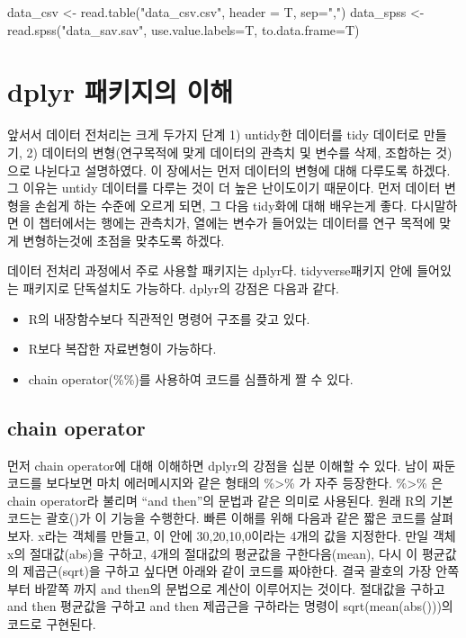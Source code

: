 \documentclass[
]{book}
\newenvironment{Shaded}{\begin{snugshade}}{\end{snugshade}}
\newcommand{\AttributeTok}[1]{\textcolor[rgb]{0.77,0.63,0.00}{#1}}
\newcommand{\FunctionTok}[1]{\textcolor[rgb]{0.00,0.00,0.00}{#1}}
\newcommand{\NormalTok}[1]{#1}
\newcommand{\OtherTok}[1]{\textcolor[rgb]{0.56,0.35,0.01}{#1}}
\newcommand{\StringTok}[1]{\textcolor[rgb]{0.31,0.60,0.02}{#1}}
\providecommand{\tightlist}{%
  \setlength{\itemsep}{0pt}\setlength{\parskip}{0pt}}
\theoremstyle{definition}
\theoremstyle{definition}
\theoremstyle{definition}
\theoremstyle{definition}
\theoremstyle{remark}
\begin{document}
\begin{Shaded}
\begin{Highlighting}[]
\NormalTok{data\_csv }\OtherTok{\textless{}{-}} \FunctionTok{read.table}\NormalTok{(}\StringTok{"data\_csv.csv"}\NormalTok{, }\AttributeTok{header =}\NormalTok{ T, }\AttributeTok{sep=}\StringTok{","}\NormalTok{) }
\NormalTok{data\_spss }\OtherTok{\textless{}{-}} \FunctionTok{read.spss}\NormalTok{(}\StringTok{"data\_sav.sav"}\NormalTok{, }\AttributeTok{use.value.labels=}\NormalTok{T, }\AttributeTok{to.data.frame=}\NormalTok{T)}
\end{Highlighting}
\end{Shaded}

\hypertarget{dplyr-uxd328uxd0a4uxc9c0uxc758-uxc774uxd574}{%
\section{dplyr 패키지의 이해}\label{dplyr-uxd328uxd0a4uxc9c0uxc758-uxc774uxd574}}

앞서서 데이터 전처리는 크게 두가지 단계 1) untidy한 데이터를 tidy 데이터로 만들기, 2) 데이터의 변형(연구목적에 맞게 데이터의 관측치 및 변수를 삭제, 조합하는 것)으로 나뉜다고 설명하였다. 이 장에서는 먼저 데이터의 변형에 대해 다루도록 하겠다. 그 이유는 untidy 데이터를 다루는 것이 더 높은 난이도이기 때문이다. 먼저 데이터 변형을 손쉽게 하는 수준에 오르게 되면, 그 다음 tidy화에 대해 배우는게 좋다. 다시말하면 이 챕터에서는 행에는 관측치가, 열에는 변수가 들어있는 데이터를 연구 목적에 맞게 변형하는것에 초점을 맞추도록 하겠다.

데이터 전처리 과정에서 주로 사용할 패키지는 dplyr다. tidyverse패키지 안에 들어있는 패키지로 단독설치도 가능하다. dplyr의 강점은 다음과 같다.

\begin{itemize}
\tightlist
\item
  R의 내장함수보다 직관적인 명령어 구조를 갖고 있다.
\item
  R보다 복잡한 자료변형이 가능하다.
\item
  chain operator(\%\%)를 사용하여 코드를 심플하게 짤 수 있다.
\end{itemize}

\hypertarget{chain-operator}{%
\subsection{chain operator}\label{chain-operator}}

먼저 chain operator에 대해 이해하면 dplyr의 강점을 십분 이해할 수 있다. 남이 짜둔 코드를 보다보면 마치 에러메시지와 같은 형태의 \%\textgreater\% 가 자주 등장한다. \%\textgreater\% 은 chain operator라 불리며 ``and then''의 문법과 같은 의미로 사용된다. 원래 R의 기본 코드는 괄호()가 이 기능을 수행한다.
빠른 이해를 위해 다음과 같은 짧은 코드를 살펴보자. x라는 객체를 만들고, 이 안에 30,20,10,0이라는 4개의 값을 지정한다. 만일 객체 x의 절대값(abs)을 구하고, 4개의 절대값의 평균값을 구한다음(mean), 다시 이 평균값의 제곱근(sqrt)을 구하고 싶다면 아래와 같이 코드를 짜야한다. 결국 괄호의 가장 안쪽부터 바깥쪽 까지 and then의 문법으로 계산이 이루어지는 것이다. 절대값을 구하고 and then 평균값을 구하고 and then 제곱근을 구하라는 명령이 sqrt(mean(abs()))의 코드로 구현된다.
\end{document}
